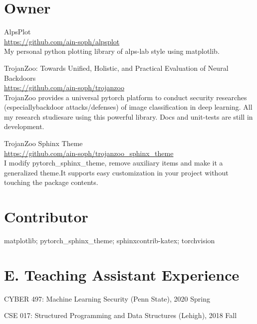\documentclass{resume}
\begin{document}
\begin{resume}
\section{Owner}
\vspace{8pt}

AlpsPlot \\
\url{https://github.com/ain-soph/alpsplot} \\
My personal python plotting library of alps-lab style using matplotlib.

TrojanZoo: Towards Unified, Holistic, and Practical Evaluation of Neural Backdoors \\
\url{https://github.com/ain-soph/trojanzoo} \\
TrojanZoo provides a universal pytorch platform to conduct security researches (especiallybackdoor attacks/defenses) of image classification in deep learning. All my research studiesare using this powerful library. Docs and unit-tests are still in development.

TrojanZoo Sphinx Theme \\
\url{https://github.com/ain-soph/trojanzoo_sphinx_theme} \\
I modify pytorch\_sphinx\_theme, remove auxiliary items and make it a generalized theme.It supports easy customization in your project without touching the package contents.

\section{Contributor}
\vspace{8pt}

matplotlib; pytorch\_sphinx\_theme; sphinxcontrib-katex; torchvision


\vspace{0.2in} 
\section{E. Teaching Assistant Experience}
\vspace{8pt}

CYBER 497: Machine Learning Security (Penn State), 2020 Spring

CSE 017: Structured Programming and Data Structures (Lehigh), 2018 Fall


\end{resume} 
\end{document}
